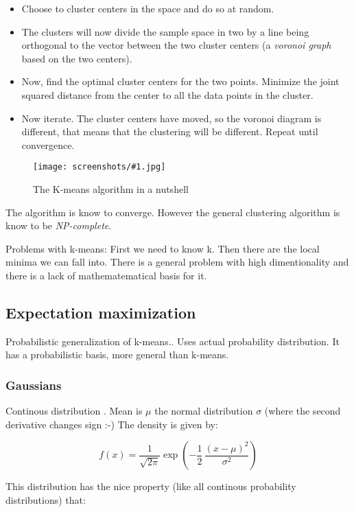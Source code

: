 \documentclass[a4, 12pt, english, USenglish]{scrreprt}
\newcommand{\screenshot}[2]{
\begin{figure}[htb]
\texttt{[image: screenshots/\#1.jpg]}
\label{#1}
\caption{#2}
\end{figure}}
\newcommand{\parens}[1]{\ensuremath{\left({#1}\right)}}
\newcommand{\idx}[1]{{\em #1}\index{#1}}
\begin{document}
\begin{itemize}
\item Choose to cluster centers in the space and do so at random.   
\item The clusters will now divide the sample space in two by a line
  being orthogonal to the vector between the two cluster centers (a
  \idx{voronoi graph} based on the two centers).
\item Now, find the optimal cluster centers for the two points.
Minimize the joint squared distance from the center to all the data
points in the cluster.

\item Now iterate.   The cluster centers have moved, so the voronoi
  diagram is different, that means that the clustering will be
  different.  Repeat until convergence.

\end{itemize}

\screenshot{kmeansalgorithm}{The K-means algorithm in a nutshell}


The algorithm is know to converge.  However the general clustering
algorithm is know to be \idx{NP-complete}.

Problems with k-means: First we need to know k.     Then there are the
local minima we can fall into. There is a general problem with high
dimentionality and there is a lack of mathematematical basis for it.



\subsection{Expectation maximization}

Probabilistic generalization of k-means..  Uses actual probability
distribution. It has a probabilistic basis, more general than k-means.

\subsubsection{Gaussians}

Continous distribution .  Mean is \(\mu\) the normal distribution
\(\sigma\) (where the second derivative changes sign :-)  The density
is given by:

\[
   f(x) = \frac{1}{\sqrt{2\pi}}\exp{\parens{-\frac{1}{2}\, \frac{(x-\mu)^2}{\sigma^2}}}
\]

This distribution has the nice property (like all continous
probability distributions) that:
\end{document}
